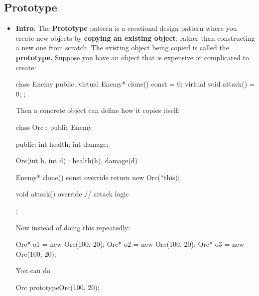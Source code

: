 \documentclass{report}
\begin{document}
    \subsection{Prototype}
    \begin{itemize}
        \item \textbf{Intro}: The \textbf{Prototype} pattern is a creational design pattern where you create new objects by \textbf{copying an existing object}, rather than constructing a new one from scratch. The existing object being copied is called the \textbf{prototype.}
            \bigbreak \noindent 
            Suppose you have an object that is expensive or complicated to create:
            \bigbreak \noindent 
            \begin{cppcode}
                class Enemy {
                public:
                    virtual Enemy* clone() const = 0;
                    virtual void attack() = 0;
                };
            \end{cppcode}
            \bigbreak \noindent 
            Then a concrete object can define how it copies itself:
            \bigbreak \noindent 
            \begin{cppcode}
                class Orc : public Enemy {
                    public:
                    int health;
                    int damage;

                    Orc(int h, int d) : health(h), damage(d) {}

                    Enemy* clone() const override {
                        return new Orc(*this);
                    }

                    void attack() override {
                        // attack logic
                    }
                };
            \end{cppcode}
            \bigbreak \noindent 
            Now instead of doing this repeatedly:
            \bigbreak \noindent 
            \begin{cppcode}
                Orc* o1 = new Orc(100, 20);
                Orc* o2 = new Orc(100, 20);
                Orc* o3 = new Orc(100, 20);
            \end{cppcode}
            \bigbreak \noindent 
            You can do 
            \bigbreak \noindent 
            \begin{cppcode}
                Orc prototypeOrc(100, 20);


\end{cppcode}
\end{itemize}
\end{document}
